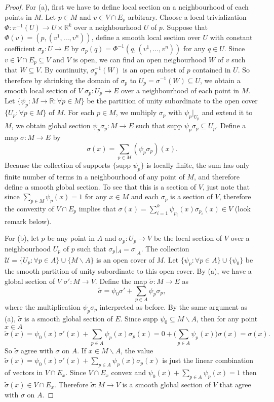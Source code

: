 \documentclass[a4paper]{article}
\theoremstyle{remark}
\newcommand{\er}{\mathbb{R}} %
\newcommand{\rk}{\mathbb{R}^k} %
\newcommand{\subhim}{\subseteq} %
\newcommand\wtilde[1]{\widetilde{#1}} %
\begin{document}
\begin{proof}
For (a), first we have to define local section on a neighbourhood of each points in $M$. Let $p \in M$ and $v \in V\cap E_p$ arbitrary. Choose a local trivialization $\Phi : \pi^{-1}(U) \to U\times \rk$ over a neighbourhood $U$ of $p$. Suppose that $\Phi(v) = (p, (v^1,\dots,v^n))$, define a smooth local section over $U$ with constant coefficient $\sigma_p : U \to E$ by $\sigma_p(q) = \Phi^{-1} (q,(v^1,\dots,v^n))$ for any $q \in U$. Since $v \in V\cap E_p \subhim V$ and $V$ is open, we can find an open neigbourhood $W$ of $v$ such that $W \subhim V$. By continuity, $\sigma_p^{-1}(W)$ is an open subset of $p$ contained in $U$. So therefore by shrinking the domain of $\sigma_p$ to $U_p = \sigma^{-1}(W) \subhim U$, we obtain a smooth local section of $V$ $\sigma_p : U_p \to E$ over a neighbourhood of each point in  $M$. Let $\{\psi_p : M \to \er  : \forall p \in M \}$ be the partition of unity subordinate to the open cover $\{U_p : \forall p \in M \}$ of $M$. For each $p \in M$, we multiply $\sigma_p$ with $\psi_p|_{U_p}$ and extend it to $M$, we obtain global section $\psi_p \sigma_p : M \to E$ such that supp $\psi_p \sigma_p \subhim U_p$. Define a map $\sigma : M \to E$ by 
$$
\sigma(x) = \sum_{p \in M} (\psi_p \sigma_p)(x).
$$
Because the collection of supports $\{\text{supp }\psi_p \}$ is locally finite, the sum has only finite number of terms in a neighbourhood of any point of $M$, and therefore define a smooth global section. To see that this is a section of $V$, just note that since $\sum_{p \in M} \psi_p(x) = 1$ for any $x \in M$ and each $\sigma_p$ is a section of $V$, therefore the convexity of $V \cap E_p$ implies that $\sigma(x) = \sum_{i=1}^{k} \psi_{p_i}(x) \sigma_{p_i}(x) \in V$ (look remark below).

For (b), let $p$ be any point in $A$ and $\sigma_p : U_p \to V$ be the local section of $V$ over a neighbourhood $U_p$ of $p$ such that $\sigma_p|_A = \sigma|_A$. The collection $\mathcal{U} = \{U_p : \forall p\in A \} \cup \{M \smallsetminus A\}$ is an open cover of $M$. Let $\{\psi_p  : \forall p \in A \} \cup \{\psi_0\}$ be the smooth partition of unity subordinate to this open cover. By (a), we have a global section of $V$ $\sigma' : M \to V$. Define the map $\wtilde{\sigma} : M \to E$ as
$$
\wtilde{\sigma} = \psi_0 \sigma' + \sum_{p \in A} \psi_p \sigma_p,
$$ 
where the multiplication $\psi_p \sigma_p$ interpreted as before. By the same argument as (a), $\wtilde{\sigma}$ is a smooth global section of $E$. Since supp $\psi_0 \subhim M \smallsetminus A$, then for any point $x \in A$
$$
\wtilde{\sigma}(x) = \psi_0(x) \sigma'(x) + \sum_{p \in A} \psi_p(x) \sigma_p(x) =  0 + \big( \sum_{p \in A} \psi_p(x) \big) \sigma(x) = \sigma(x).
$$  
So $\wtilde{\sigma}$ agree with $\sigma$ on $A$. If $x \in M \smallsetminus A$, the value $\wtilde{\sigma}(x) = \psi_0(x) \sigma'(x) + \sum_{p \in A} \psi_p(x) \sigma_p(x)$ is just the linear combination of vectors in $V \cap E_x$. Since $V \cap E_x$ convex and $\psi_0(x) + \sum_{p \in A} \psi_p(x) = 1$ then $\wtilde{\sigma}(x) \in V \cap E_x$. Therefore $\wtilde{\sigma} : M \to V$ is a smooth global section of $V$ that agree with $\sigma$ on $A$. 


\end{proof}
\end{document}
